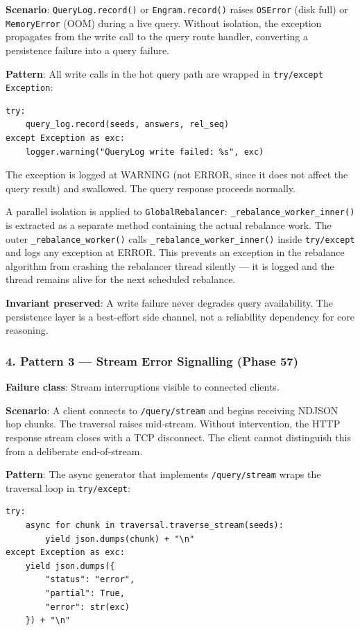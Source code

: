 \textbf{Scenario}: \texttt{QueryLog.record()} or \texttt{Engram.record()} raises \texttt{OSError} (disk full) or \texttt{MemoryError} (OOM) during a live query. Without isolation, the exception propagates from the write call to the query route handler, converting a persistence failure into a query failure.

\textbf{Pattern}: All write calls in the hot query path are wrapped in \texttt{try/except Exception}:

\begin{lstlisting}
try:
    query_log.record(seeds, answers, rel_seq)
except Exception as exc:
    logger.warning("QueryLog write failed: %s", exc)
\end{lstlisting}

The exception is logged at WARNING (not ERROR, since it does not affect the query result) and swallowed. The query response proceeds normally.

A parallel isolation is applied to \texttt{GlobalRebalancer}: \texttt{\_rebalance\_worker\_inner()} is extracted as a separate method containing the actual rebalance work. The outer \texttt{\_rebalance\_worker()} calls \texttt{\_rebalance\_worker\_inner()} inside \texttt{try/except} and logs any exception at ERROR. This prevents an exception in the rebalance algorithm from crashing the rebalancer thread silently — it is logged and the thread remains alive for the next scheduled rebalance.

\textbf{Invariant preserved}: A write failure never degrades query avail\-ability. The persistence layer is a best-effort side channel, not a reliability dependency for core reasoning.

\subsubsection{4. Pattern 3 — Stream Error Signalling (Phase 57)}

\textbf{Failure class}: Stream inter\-ruptions visible to connected clients.

\textbf{Scenario}: A client connects to \texttt{/query/stream} and begins receiving NDJSON hop chunks. The traversal raises mid-stream. Without inter\-vention, the HTTP response stream closes with a TCP disconnect. The client cannot distinguish this from a deliberate end-of-stream.

\textbf{Pattern}: The async generator that implements \texttt{/query/stream} wraps the traversal loop in \texttt{try/except}:

\begin{lstlisting}
try:
    async for chunk in traversal.traverse_stream(seeds):
        yield json.dumps(chunk) + "\n"
except Exception as exc:
    yield json.dumps({
        "status": "error",
        "partial": True,
        "error": str(exc)
    }) + "\n"
\end{lstlisting}

